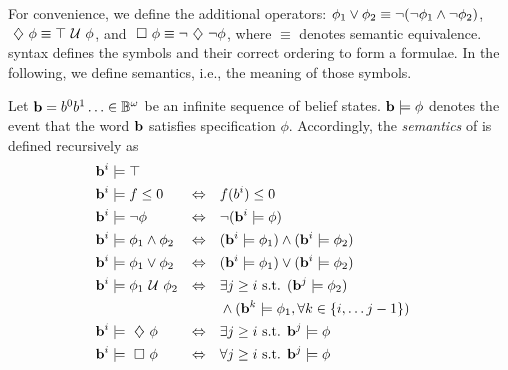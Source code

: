 \documentclass[conference]{IEEEtran}
\begin{document}
    For convenience, we define the additional operators:
    $\phi_1 \vee \phi_2 \equiv  \neg (\neg \phi_1 \wedge \neg \phi_2)$,
    $\ \diamondsuit\  \phi \equiv \top \ \mathcal{U}\  \phi$, and
    $\ \square\  \phi \equiv \neg \ \diamondsuit\  \neg \phi$,
    where $\equiv$ denotes semantic equivalence. \DTL syntax defines the symbols and their correct ordering to form a formulae. In the following, we define \DTL semantics, i.e., the meaning of those symbols.

    \begin{definition}
    \label{def:gdtl-semantics}
    Let $\mathbf{b} = b^0b^1 \ldots \in \mathbb{B}^{\omega}$
    be an infinite sequence of belief states. $\mathbf{b} \models \phi$ denotes the event that the word $\mathbf{b}$ satisfies specification $\phi$. Accordingly, the {\em semantics} of \DTL is defined recursively as
    \begin{align*}
    &\BF{b}^i \models  \top  & \\
    &\BF{b}^i \models f \leq 0 & \Equiv\quad & f(b^i) \leq 0\\ %
    &\BF{b}^i \models \notltl \phi & \Equiv\quad & \notltl (\BF{b}^i \models \phi) \\
    &\BF{b}^i \models \phi_1 \andltl  \phi_2  & \Equiv\quad & ( \BF{b}^i \models \phi_1 ) \andltl ( \BF{b}^i \models \phi_2 ) \\
    &\BF{b}^i \models \phi_1 \orltl  \phi_2  & \Equiv\quad & ( \BF{b}^i \models \phi_1 ) \orltl ( \BF{b}^i \models \phi_2 ) \\
    &\BF{b}^i \models  \phi_1 \Until \phi_2 & \Equiv\quad & \exists j \geq i \text{ s.t. } ( \BF{b}^j \models \phi_2 ) \\
    & & & \andltl (\BF{b}^k \models \phi_1, \forall k \in \{i, \ldots j-1\})\\
    &\BF{b}^i \models \Event \phi  & \Equiv\quad & \exists j \geq i \text{ s.t. } \BF{b}^j \models \phi \\
    &\BF{b}^i \models \Always \phi  & \Equiv\quad & \forall j \geq i \text{ s.t. } \BF{b}^j \models \phi
    \end{align*}
    
    \end{definition}
    
\end{document}
